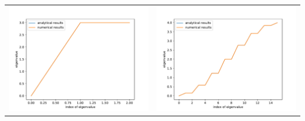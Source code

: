 \documentclass[a4paper,zihao=5,UTF8]{ctexart}
\begin{document}
	\begin{table}[htbp]
		\centering
		\begin{tabular}[htbp]{cc}
			\includegraphics[scale=0.5]{1_compare_n=3.pdf} & \includegraphics[scale=0.5]{1_compare_n=16.pdf}\\

\end{tabular}
\end{table}
\end{document}
